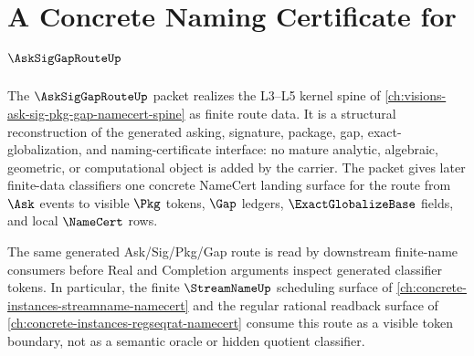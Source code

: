 \chapter{A Concrete Naming Certificate for $\AskSigGapRouteUp$}
\label{ch:concrete-instances-ask-sig-gap-route-namecert}

The $\AskSigGapRouteUp$ packet realizes the L3--L5 kernel spine of \autoref{ch:visions-ask-sig-pkg-gap-namecert-spine} as finite route data. It is a structural reconstruction of the generated asking, signature, package, gap, exact-globalization, and naming-certificate interface: no mature analytic, algebraic, geometric, or computational object is added by the carrier. The packet gives later finite-data classifiers one concrete NameCert landing surface for the route from $\Ask$ events to visible $\Pkg$ tokens, $\Gap$ ledgers, $\ExactGlobalizeBase$ fields, and local $\NameCert$ rows.

The same generated Ask/Sig/Pkg/Gap route is read by downstream finite-name consumers before Real and Completion arguments inspect generated classifier tokens. In particular, the finite $\StreamNameUp$ scheduling surface of \autoref{ch:concrete-instances-streamname-namecert} and the regular rational readback surface of \autoref{ch:concrete-instances-regseqrat-namecert} consume this route as a visible token boundary, not as a semantic oracle or hidden quotient classifier.

